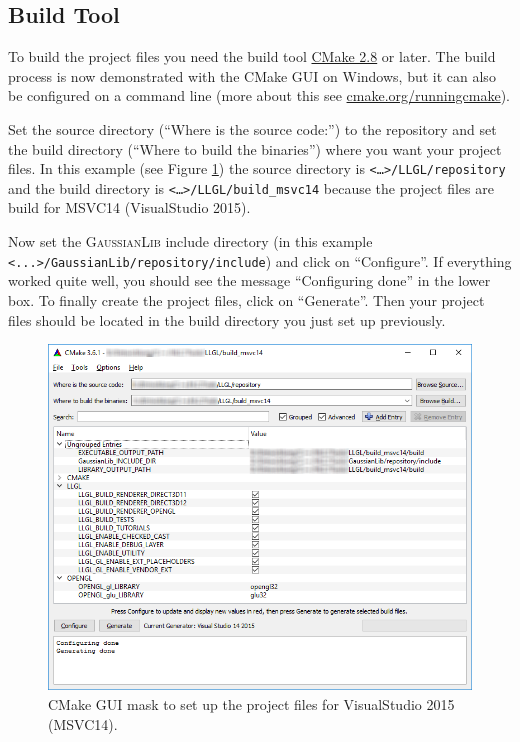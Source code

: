 \documentclass{article}
\begin{document}
\subsection{Build Tool}

To build the \LLGL project files you need the build tool \href{https://cmake.org/}{CMake 2.8} or later.
The build process is now demonstrated with the CMake GUI on Windows, but it can also be configured
on a command line (more about this see \href{https://cmake.org/runningcmake/}{cmake.org/runningcmake}).

Set the source directory (``Where is the source code:'') to the \LLGL repository
and set the build directory (``Where to build the binaries'') where you want your project files.
In this example (see Figure \ref{fig:cmake_mask1}) the source directory is \texttt{<\dots>/LLGL/repository}
and the build directory is \texttt{<\dots>/LLGL/build\_msvc14} because the project files are build
for MSVC14 (VisualStudio 2015).

Now set the \textsc{GaussianLib} include directory (in this example \texttt{<...>/GaussianLib/repository/include})
and click on ``Configure''. If everything worked quite well, you should see the message ``Configuring done''
in the lower box. To finally create the project files, click on ``Generate''.
Then your project files should be located in the build directory you just set up previously.

\begin{figure}[H]
	\centering
	\includegraphics[width=0.9 \textwidth]{cmake_mask1}
	\caption{CMake GUI mask to set up the project files for VisualStudio 2015 (MSVC14).}
	\label{fig:cmake_mask1}
\end{figure}
\end{document}

